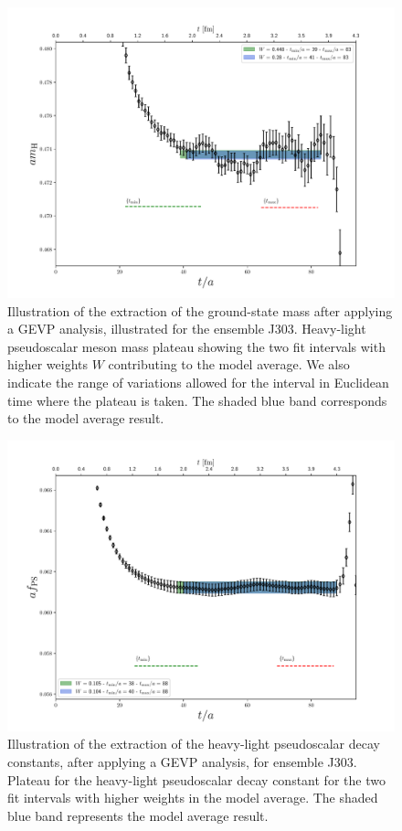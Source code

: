 \begin{figure}
  	\centering
  	\includegraphics[scale=0.5]{./cap6/figs/matching/m8_plateau.pdf}
  	\caption{Illustration of the extraction of the ground-state mass after applying a GEVP analysis, illustrated for the ensemble J303. Heavy-light pseudoscalar meson mass plateau showing the two fit intervals with higher weights $W$ contributing to the model average. We also indicate the range of variations allowed for the interval in Euclidean time where the plateau is taken. The shaded blue band  corresponds to the model average result.} 
\label{fig:meff_plateau} 
\end{figure}

\begin{figure}
	\centering
	\includegraphics[scale=0.5]{./cap6/figs/fds/f8_plateau.pdf}
	\caption{Illustration of the extraction of the heavy-light pseudoscalar decay constants, after applying a GEVP analysis, for ensemble J303. Plateau for the heavy-light pseudoscalar decay constant for the two fit intervals with higher weights in the model average. The shaded blue band represents the model average result. }
	\label{fig:decay_plateau} 
\end{figure}